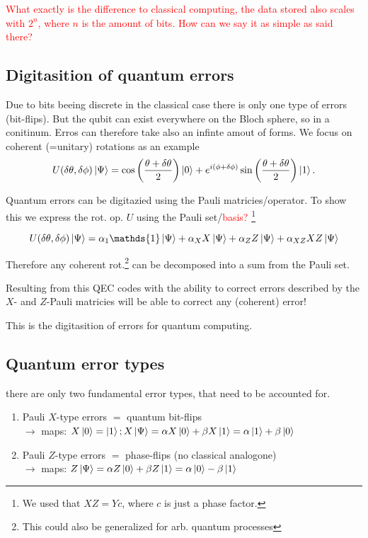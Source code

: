 \textcolor{red}{What exactly is the difference to classical computing, the data stored also scales with $2^n$, where $n$ is the amount of bits.
How can we say it as simple as said there?
}


\subsection{Digitasition of quantum errors}

Due to bits beeing discrete in the classical case there is only one type of errors (bit-flips). 
But the qubit can exist everywhere on the Bloch sphere, so in a conitinum. 
Erros can therefore take also an infinte amout of forms.
We focus on coherent (=unitary) rotations as an example
\begin{equation}
    U(\delta \theta, \delta \phi) \ket{\Psi}=
    \cos\left(\frac{\theta + \delta \theta}{2}\right) \ket{0} +
    e^{i(\phi + \delta \phi)} 
    \sin\left(\frac{\theta + \delta \theta}{2}\right) \ket{1}.
\end{equation} 

Quantum errors can be digitazied using the Pauli matricies/operator. 
To show this we express the rot. op. $U$ using the Pauli set/\textcolor{red}{basis?} 
\footnote{We used that $XZ=Yc$, where $c$ is just a phase factor.}

\begin{equation}
    U(\delta \theta, \delta \phi)\ket{\Psi} = 
    \alpha_1 \mathds{1} \ket{\Psi} +
    \alpha_X X \ket{\Psi}+
    \alpha_Z Z \ket{\Psi}+
    \alpha_{XZ} XZ \ket{\Psi}
\end{equation}

Therefore any coherent rot.\footnote{This could also be generalized for arb. quantum processes} can be decomposed into a sum from the Pauli set. 

Resulting from this QEC codes with the ability to correct errors described by the $X$- and $Z$-Pauli matricies will be able to correct any (coherent) error!

This is the digitasition of errors for quantum computing.
\subsection{Quantum error types}
 there are only two fundamental error types, that need to be accounted for.

\begin{enumerate}
    \item Pauli $X$-type errors $=$ quantum bit-flips \\
    $\rightarrow$ maps: $X\ket{0} = \ket{1}; X \ket{\Psi}= \alpha X \ket{0} + \beta X \ket{1} = \alpha  \ket{1} + \beta \ket{0}   $
    \item Pauli $Z$-type errors $=$ phase-flips (no classical analogone)\\
    $\rightarrow$ maps:  $Z \ket{\Psi}= \alpha Z \ket{0} + \beta Z \ket{1} = \alpha  \ket{0} - \beta \ket{1}   $
\end{enumerate}


